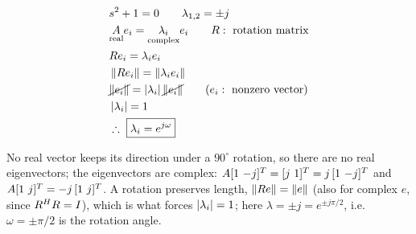 \begin{minipage}{0.42\textwidth}
\centering
{}
\end{minipage}\hfill
\begin{minipage}{0.55\textwidth}
\begin{align*}
&s^2+1=0\qquad\lambda_{1,2}=\pm j\\
&\underset{\text{real}}{A}e_i=\underset{\text{complex}}{\lambda_i}e_i\qquad R:\text{ rotation matrix}\\
&Re_i=\lambda_ie_i\\
&\left\lVert Re_i \right\rVert=\left\lVert \lambda_ie_i \right\rVert\\
&\cancel{\left\lVert e_i \right\rVert}=\left\lvert \lambda_i \right\rvert\cancel{\left\lVert e_i \right\rVert}\qquad (e_i:\text{ nonzero vector})\\
&\left\lvert \lambda_i \right\rvert=1\\
&\therefore\ \boxed{\lambda_i=e^{j\omega}}
\end{align*}
\end{minipage}
\begin{insight}
No real vector keeps its direction under a $90^\circ$ rotation, so there are no real eigenvectors; the eigenvectors are complex: $A[1\ {-j}]\T=[j\ 1]\T=j\,[1\ {-j}]\T$ and $A[1\ j]\T=-j\,[1\ j]\T$. A rotation preserves length, $\left\lVert Re \right\rVert=\left\lVert e \right\rVert$ (also for complex $e$, since $R^{H} R=I$), which is what forces $\left\lvert \lambda_i \right\rvert=1$; here $\lambda=\pm j=e^{\pm j\pi/2}$, i.e.\ $\omega=\pm\pi/2$ is the rotation angle.
\end{insight}


